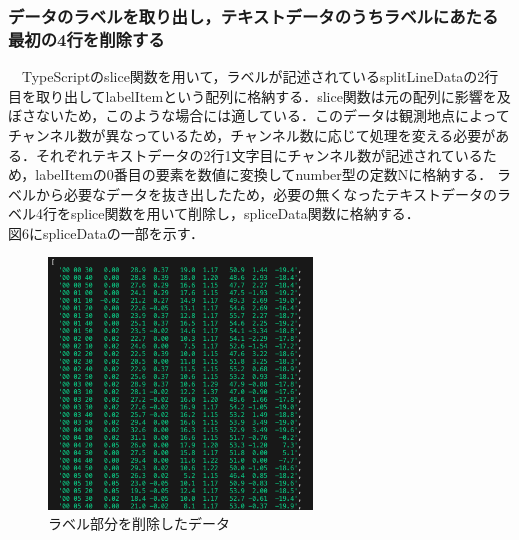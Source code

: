 \subsubsection{データのラベルを取り出し，テキストデータのうちラベルにあたる最初の4行を削除する}
　TypeScriptのslice関数を用いて，ラベルが記述されているsplitLineDataの2行目を取り出してlabelItemという配列に格納する．slice関数は元の配列に影響を及ぼさないため，このような場合には適している．\cite{mdn_slice}このデータは観測地点によってチャンネル数が異なっているため，チャンネル数に応じて処理を変える必要がある．それぞれテキストデータの2行1文字目にチャンネル数が記述されているため，labelItemの0番目の要素を数値に変換してnumber型の定数Nに格納する．
 ラベルから必要なデータを抜き出したため，必要の無くなったテキストデータのラベル4行をsplice関数を用いて削除し，spliceData関数に格納する．\\
 図6にspliceDataの一部を示す．\\
 \begin{figure}[h]
   \centering
   \includegraphics[width=70mm]{fig/spliceData.png}
   \caption{ラベル部分を削除したデータ}
 \end{figure}
 
